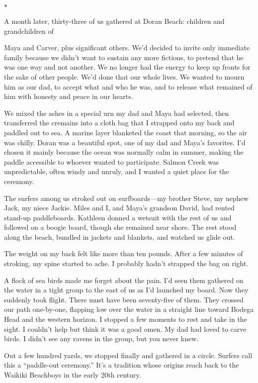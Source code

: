 \documentclass[12pt]{book}
\begin{document}
\begin{center}$*$\end{center}

A month later, thirty-three of us gathered at Doran Beach: children and grandchildren of

Maya and Carver, plus significant others. We'd decided to invite only immediate family because we didn't want to sustain any more fictions, to pretend that he was one way and not another. We no longer had the energy to keep up fronts for the sake of other people. We'd done that our whole lives. We wanted to mourn him as our dad, to accept what and who he was, and to release what remained of him with honesty and peace in our hearts.

We mixed the ashes in a special urn my dad and Maya had selected, then transferred the cremains into a cloth bag that I strapped onto my back and paddled out to sea. A marine layer blanketed the coast that morning, so the air was chilly. Doran was a beautiful spot, one of my dad and Maya's favorites. I'd chosen it mainly because the ocean was normally calm in summer, making the paddle accessible to whoever wanted to participate. Salmon Creek was unpredictable, often windy and unruly, and I wanted a quiet place for the ceremony.

The surfers among us stroked out on surfboards---my brother Steve, my nephew Jack, my niece Jackie. Miles and I, and Maya's grandson David, had rented stand-up paddleboards. Kathleen donned a wetsuit with the rest of us and followed on a boogie board, though she remained near shore. The rest stood along the beach, bundled in jackets and blankets, and watched us glide out.

The weight on my back felt like more than ten pounds. After a few minutes of stroking, my spine started to ache. I probably hadn't strapped the bag on right.

A flock of sea birds made me forget about the pain. I'd seen them gathered on the water in a tight group to the east of us as I'd launched my board. Now they suddenly took flight. There must have been seventy-five of them. They crossed our path one-by-one, flapping low over the water in a straight line toward Bodega Head and the western horizon. I stopped a few moments to rest and take in the sight. I couldn't help but think it was a good omen. My dad had loved to carve birds. I didn't see any ravens in the group, but you never knew.

Out a few hundred yards, we stopped finally and gathered in a circle. Surfers call this a ``paddle-out ceremony.'' It's a tradition whose origins reach back to the Waikiki Beachboys in the early 20th century.
\end{document}
